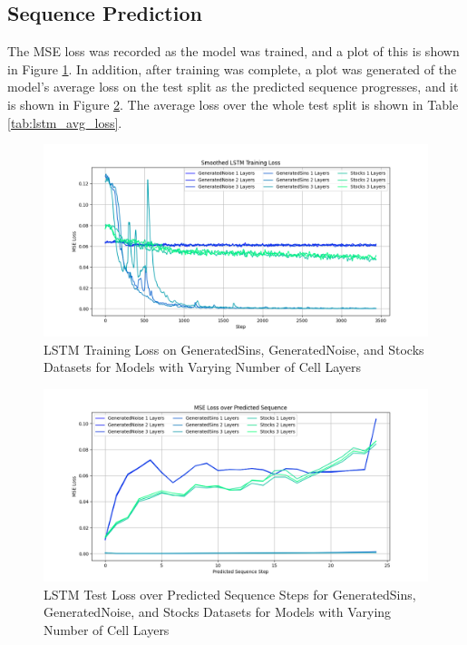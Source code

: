 \documentclass{scrartcl}
\begin{document}


\subsection{Sequence Prediction}
\label{subsec:experiment_sp}

The MSE loss was recorded as the model was trained, and a plot of this is shown
in Figure \ref{plt:lstm_train_loss}. In addition, after training was complete,
a plot was generated of the model's average loss on the test split as the
predicted sequence progresses, and it is shown in Figure
\ref{plt:lstm_seq_loss}. The average loss over the whole test split is shown in
Table \ref{tab:lstm_avg_loss}.

\begin{figure}[H]
	\begin{center}
		\includegraphics[width=1\textwidth]{plots/lstm_train_loss.png}
	\end{center}
	\caption{LSTM Training Loss on GeneratedSins, GeneratedNoise, and Stocks
	Datasets for Models with Varying Number of Cell Layers}
	\label{plt:lstm_train_loss}
\end{figure}

\begin{figure}[H]
	\begin{center}
		\includegraphics[width=1\textwidth]{plots/lstm_seq_loss.png}
	\end{center}
	\caption{LSTM Test Loss over Predicted Sequence Steps for GeneratedSins, GeneratedNoise, and Stocks Datasets for Models 
	with Varying Number of Cell Layers}
	\label{plt:lstm_seq_loss}
\end{figure}
\end{document}
